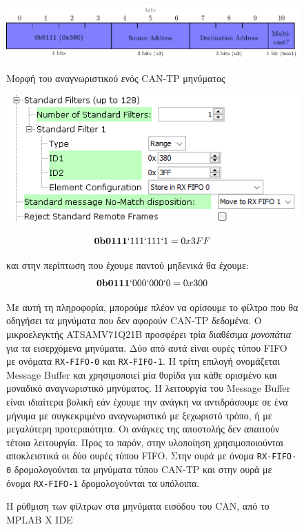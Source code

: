 \documentclass[a4paper,nobib,justified]{tufte-book}
\begin{document}
\begin{figure}
\begin{marginfigure}
	\includegraphics[width=1\linewidth]{media/diagrams/tp-message-id.pdf}
	\label{fig:tp-message-id}
	\caption{Μορφή του αναγνωριστικού ενός CAN-TP μηνύματος}
	\goodbreak
	\includegraphics[width=1\linewidth]{media/images/mplab-filters.png}
	\label{mplab-filters}
	\caption{Η ρύθμιση των φίλτρων στα μηνύματα εισόδου του CAN, από το MPLAB X IDE}
\end{marginfigure}

\begin{equation}
\textbf{0b0111}`111`111`1 = 0x3FF
\end{equation}

και στην περίπτωση που έχουμε παντού μηδενικά θα έχουμε:
\begin{equation}
\textbf{0b0111}`000`000`0 = 0x300
\end{equation}

Με αυτή τη πληροφορία, μπορούμε πλέον να ορίσουμε το φίλτρο που θα οδηγήσει τα μηνύματα που δεν αφορούν CAN-TP δεδομένα. Ο μικροελεγκτής ATSAMV71Q21B προσφέρει τρία διαθέσιμα \textit{μονοπάτια} για τα εισερχόμενα μηνύματα. Δύο από αυτά είναι ουρές τύπου FIFO με ονόματα \texttt{RX-FIFO-0} και \texttt{RX-FIFO-1}. Η τρίτη επιλογή ονομάζεται Message Buffer και χρησιμοποιεί μία θυρίδα για κάθε ορισμένο  και μοναδικό αναγνωριστικό μηνύματος. Η λειτουργία του Message Buffer είναι ιδιαίτερα βολική εάν έχουμε την ανάγκη να αντιδράσουμε σε ένα μήνυμα με συγκεκριμένο αναγνωριστικό με ξεχωριστό τρόπο, ή με μεγαλύτερη προτεραιότητα. Οι ανάγκες της αποστολής δεν απαιτούν τέτοια λειτουργία. Προς το παρόν, στην υλοποίηση χρησιμοποιούνται αποκλειστικά οι δύο ουρές τύπου FIFO. Στην ουρά με όνομα \texttt{RX-FIFO-0} δρομολογούνται τα μηνύματα τύπου CAN-TP και στην ουρά με όνομα \texttt{RX-FIFO-1} δρομολογούνται τα υπόλοιπα.


\end{figure}
\end{document}
